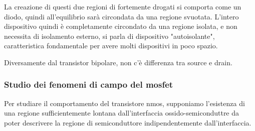 \documentclass[../template]{subfiles}
\begin{document}
La creazione di questi due regioni di fortemente drogati si comporta come un diodo, quindi all'equilibrio sarà circondata da una regione svuotata.
L'intero dispositivo quindi è completamente circondato da una regione isolata, e non necessita di isolamento esterno, si parla di dispositivo "autoisolante", caratteristica fondamentale per avere molti dispositivi in poco spazio.

Diversamente dal transistor bipolare, non c'è differenza tra source e drain.


\subsubsection{Studio dei fenomeni di campo del mosfet}

\def\xd{3}
\def\tox{2}

\begin{figure}[h]
    \centering
\end{figure}
Per studiare il comportamento del transistore nmos, supponiamo l'esistenza di una regione sufficientemente lontana dall'interfaccia ossido-semiconduttre da poter descrivere la regione di semiconduttore indipendentemente dall'interfaccia.
\end{document}
